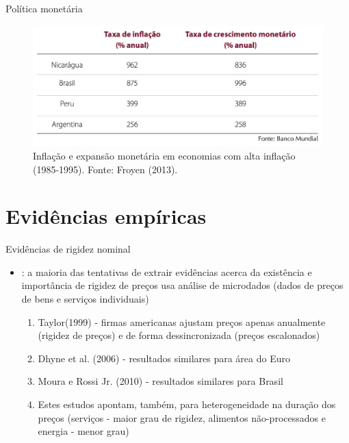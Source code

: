 \documentclass[10pt]{beamer}
\begin{document}
\begin{frame}
    {Política monetária}
    \begin{figure}
        \centering
        \includegraphics[width=\textwidth]{./figures/aula3_fig4.PNG}
        \caption{Inflação e expansão monetária em economias com alta inflação (1985-1995). Fonte: Froyen (2013).}
        \label{aula3_fig4}
    \end{figure}
\end{frame}

\section{Evidências empíricas}
\begin{frame}
    {Evidências de rigidez nominal}
    \begin{itemize}
        \item {}: a maioria das tentativas de extrair evidências acerca da existência e importância de rigidez de preços usa análise de microdados (dados de preços de bens e serviços individuais)\medskip
        \begin{enumerate}
            \item Taylor(1999) - firmas americanas ajustam preços apenas anualmente (rigidez de preços) e de forma dessincronizada (preços escalonados)\medskip
            \item Dhyne et al. (2006) - resultados similares para área do Euro\medskip
            \item Moura e Rossi Jr. (2010) - resultados similares para Brasil\medskip
            \item Estes estudos apontam, também, para heterogeneidade na duração dos preços (serviços - maior grau de rigidez, alimentos não-processados e energia - menor grau)
        \end{enumerate}
    \end{itemize}
\end{frame}
\end{document}
